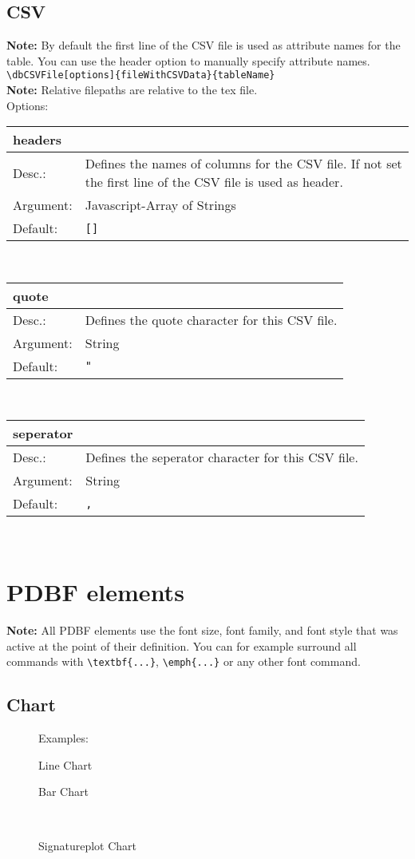 \documentclass[11pt]{article}
\def\a{5cm}
\def\b{10.5cm}
\def\option#1#2#3#4{%
\noindent \begin{tabular}{|p{\a}|p{\b}|}
\hline
\textbf{#1} & \\
\hline
Desc.: & #2 \\
\hline
Argument: & #3\\
\hline
Default:& #4\\
\hline
\end{tabular} \\[4pt]%
}
\begin{document}
\subsection{CSV}
\textbf{Note:} By default the first line of the CSV file is used as attribute names for the table. You can use the header option to manually specify attribute names.\\[3pt]
\verb|\dbCSVFile[options]{fileWithCSVData}{tableName}| \\[8pt]
\textbf{Note:} Relative filepaths are relative to the tex file.\\[4pt]
\noindent Options:\\[3pt]
%
\option
{headers}
{Defines the names of columns for the CSV file. If not set the first line of the CSV file is used as header.}
{Javascript-Array of Strings}
{\texttt{[]}}

\option
{quote}
{Defines the quote character for this CSV file.}
{String}
{\texttt{"}}

\option
{seperator}
{Defines the seperator character for this CSV file.}
{String}
{\texttt{,}}

\newpage
\section{PDBF elements}
\textbf{Note:} All PDBF elements use the font size, font family, and font style that was active at the point of their definition. You can for example surround all commands with \verb|\textbf{...}|, \verb|\emph{...}| or any other font command.\\[3pt]
\subsection{Chart}
\begin{figure}[h!]%
\hspace{-218pt}Examples:\\
    \centering
    \begin{minipage}{.48\textwidth}
    \caption{Line Chart}
    \end{minipage}
    \hspace{11pt}
    \begin{minipage}{.48\textwidth}
    \caption{Bar Chart}
    \end{minipage} \\[8pt]
    \begin{minipage}{1.0\textwidth}
    \caption{Signatureplot Chart}
    \end{minipage}
\end{figure}
\end{document}
